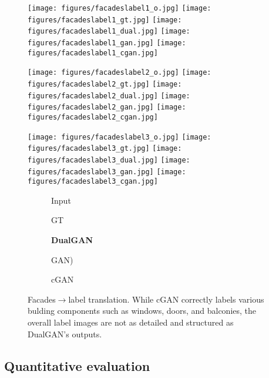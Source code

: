 \begin{figure}
\begin{center}
\texttt{[image: figures/facadeslabel1\_o.jpg]}
\texttt{[image: figures/facadeslabel1\_gt.jpg]}
\texttt{[image: figures/facadeslabel1\_dual.jpg]}
\texttt{[image: figures/facadeslabel1\_gan.jpg]}
\texttt{[image: figures/facadeslabel1\_cgan.jpg]}

\texttt{[image: figures/facadeslabel2\_o.jpg]}
\texttt{[image: figures/facadeslabel2\_gt.jpg]}
\texttt{[image: figures/facadeslabel2\_dual.jpg]}
\texttt{[image: figures/facadeslabel2\_gan.jpg]}
\texttt{[image: figures/facadeslabel2\_cgan.jpg]}

\texttt{[image: figures/facadeslabel3\_o.jpg]}
\texttt{[image: figures/facadeslabel3\_gt.jpg]}
\texttt{[image: figures/facadeslabel3\_dual.jpg]}
\texttt{[image: figures/facadeslabel3\_gan.jpg]}
\texttt{[image: figures/facadeslabel3\_cgan.jpg]}



\begin{subfigure}[]{0.19\linewidth}\caption*{Input}\end{subfigure}
\begin{subfigure}[]{0.19\linewidth}\caption*{GT}\end{subfigure}
\begin{subfigure}[]{0.19\linewidth}\caption*{\textbf{DualGAN}}\end{subfigure}
\begin{subfigure}[]{0.19\linewidth}\caption*{GAN)}\end{subfigure}
\begin{subfigure}[]{0.19\linewidth}\caption*{cGAN~\cite{isola2016image}}\end{subfigure}
\caption{Facades$\rightarrow$label translation. While cGAN correctly labels various 
bulding components such as windows, doors, and balconies, the overall label images 
are not as detailed and structured as DualGAN's outputs.} 
\label{fig:facades2label}
\end{center}
\end{figure}

\subsection{Quantitative evaluation}

